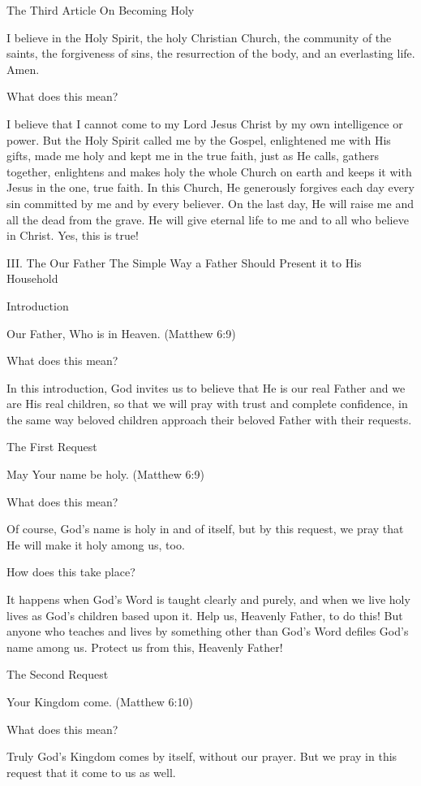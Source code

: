 The Third Article
On Becoming Holy

I believe in the Holy Spirit, the holy Christian Church, the community
of the saints, the forgiveness of sins, the resurrection of the body,
and an everlasting life. Amen.

What does this mean?

I believe that I cannot come to my Lord Jesus Christ by my own
intelligence or power. But the Holy Spirit called me by the Gospel,
enlightened me with His gifts, made me holy and kept me in the true
faith, just as He calls, gathers together, enlightens and makes holy
the whole Church on earth and keeps it with Jesus in the one, true
faith. In this Church, He generously forgives each day every sin
committed by me and by every believer. On the last day, He will raise
me and all the dead from the grave. He will give eternal life to me and
to all who believe in Christ. Yes, this is true!

III. The Our Father
The Simple Way a Father Should Present it to His Household

Introduction

Our Father, Who is in Heaven. (Matthew 6:9)

What does this mean?

In this introduction, God invites us to believe that He is our real
Father and we are His real children, so that we will pray with trust
and complete confidence, in the same way beloved children approach
their beloved Father with their requests.

The First Request

May Your name be holy. (Matthew 6:9)

What does this mean?

Of course, God's name is holy in and of itself, but by this request, we
pray that He will make it holy among us, too.

How does this take place?

It happens when God's Word is taught clearly and purely, and when we
live holy lives as God's children based upon it. Help us, Heavenly
Father, to do this! But anyone who teaches and lives by something other
than God's Word defiles God's name among us. Protect us from this,
Heavenly Father!

The Second Request

Your Kingdom come. (Matthew 6:10)

What does this mean?

Truly God's Kingdom comes by itself, without our prayer. But we pray in
this request that it come to us as well.

